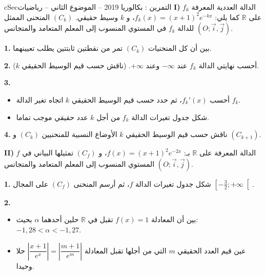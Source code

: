 \documentclass[12pt,a4paper]{article}
\newenvironment{BOX}[2]{\begin{otherlanguage}{english}\begin{arbox}{#1}{#2}}{\end{arbox}\end{otherlanguage}}
\newcounter{exo}
\newenvironment{tamrin}[1]{\stepcounter{exo}\begin{BOX}{cSec}{التمرين \theexo: #1}}{\end{BOX}}
\newcommand{\R}{\mathbb{R}}
\newenvironment{sq}{\begin{itemize}[leftmargin=2.4em,itemsep=3pt]}{\end{itemize}}
\newcommand{\qa}{\item[(أ)]}\newcommand{\qb}{\item[(ب)]}\newcommand{\qc}{\item[(جـ)]}\newcommand{\qd}{\item[(د)]}\newcommand{\qe}{\item[(هـ)]}
\newcommand{\QQ}[1]{\par\smallskip\textbf{#1.} }
\begin{document}
\begin{tamrin}{بكالوريا 2019 -- الموضوع الثاني -- رياضيات}
\textbf{I)} $f_k$ الدالة العددية المعرفة على $\R$ كما يلي: $f_k(x)=(x+1)^2e^{-kx}$، و $k$ وسيط حقيقي. $(C_k)$ المنحنى الممثل للدالة $f_k$ في المستوي المنسوب إلى المعلم المتعامد والمتجانس $(O;\vec i,\vec j)$.
\QQ{1} بين أن كل المنحنيات $(C_k)$ تمر من نقطتين ثابتتين يطلب تعيينهما.
\QQ{2} أحسب نهايتي الدالة $f_k$ عند $-\infty$ وعند $+\infty$. (ناقش حسب قيم الوسيط الحقيقي $k$).
\QQ{3}
\begin{sq}
\qa أحسب $f_k'(x)$، ثم حدد حسب قيم الوسيط الحقيقي $k$ اتجاه تغير الدالة $f_k$.
\qb شكل جدول تغيرات الدالة $f_k$ من أجل $k$ عدد حقيقي موجب تماما.
\end{sq}
\QQ{4} ناقش حسب قيم الوسيط الحقيقي $k$ الأوضاع النسبية للمنحنيين $(C_k)$ و $(C_{k+1})$.

\textbf{II)} $f$ الدالة المعرفة على $\R$ بـ: $f(x)=(x+1)^2e^{-2x}$، و $(C_f)$ تمثيلها البياني في المستوي المنسوب إلى المعلم المتعامد والمتجانس $(O;\vec i,\vec j)$.
\QQ{1} شكل جدول تغيرات الدالة $f$، ثم أرسم المنحنى $(C_f)$ على المجال $\left[-\frac32;+\infty\right[$.
\QQ{2}
\begin{sq}
\qa بين أن المعادلة $f(x)=1$ تقبل في $\R$ حلين أحدهما $\alpha$ بحيث: $-1{,}28<\alpha<-1{,}27$.
\qb عين قيم العدد الحقيقي $m$ التي من أجلها تقبل المعادلة $\left|\dfrac{x+1}{e^{x}}\right|=\left|\dfrac{m+1}{e^{m}}\right|$ حلا وحيدا.
\end{sq}
\end{tamrin}
\end{document}
